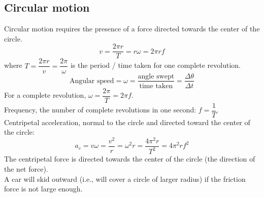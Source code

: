 \subsection{Circular motion}
Circular motion requires the presence of a force directed towards the center of the circle.
\[v=\dfrac{2\pi r}{T}=r\omega=2\pi rf\]
where $T=\dfrac{2\pi r}{v}=\dfrac{2\pi}{\omega}$ is the period / time taken for one complete revolution.\\
\[\text{Angular speed} = \omega =\dfrac{\text{angle swept}}{\text{time taken}}=\dfrac{\Delta\theta}{\Delta t}\]
For a complete revolution, $\omega=\dfrac{2\pi}{T}=2\pi f$.\\
Frequency, the number of complete revolutions in one second: $f=\dfrac{1}{T}$.\\
Centripetal acceleration, normal to the circle and directed toward the center of the circle:
\[a_c=v\omega=\dfrac{v^2}{r}=\omega^2 r=\dfrac{4\pi ^2 r}{T^2}=4\pi^2rf^2\]
The centripetal force is directed towards the center of the circle (the direction of the net force). \\
A car will skid outward (i.e., will cover a circle of larger radius) if the friction force is not large enough.
